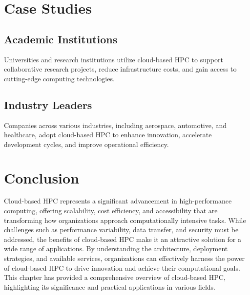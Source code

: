 \section{Case Studies}

\subsection{Academic Institutions}

Universities and research institutions utilize cloud-based HPC to support collaborative research projects, reduce infrastructure costs, and gain access to cutting-edge computing technologies.

\subsection{Industry Leaders}

Companies across various industries, including aerospace, automotive, and healthcare, adopt cloud-based HPC to enhance innovation, accelerate development cycles, and improve operational efficiency.

\section{Conclusion}

Cloud-based HPC represents a significant advancement in high-performance computing, offering scalability, cost efficiency, and accessibility that are transforming how organizations approach computationally intensive tasks. While challenges such as performance variability, data transfer, and security must be addressed, the benefits of cloud-based HPC make it an attractive solution for a wide range of applications. By understanding the architecture, deployment strategies, and available services, organizations can effectively harness the power of cloud-based HPC to drive innovation and achieve their computational goals. This chapter has provided a comprehensive overview of cloud-based HPC, highlighting its significance and practical applications in various fields.
